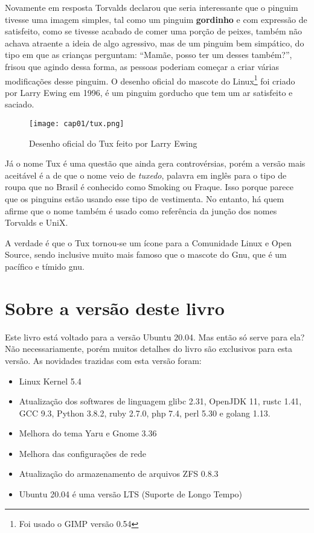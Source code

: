 Novamente em resposta Torvalds declarou que seria interessante que o pinguim tivesse uma imagem simples, tal como um pinguim \textbf{gordinho} e com expressão de satisfeito, como se tivesse acabado de comer uma porção de peixes, também não achava atraente a ideia de algo agressivo, mas de um pinguim bem simpático, do tipo em que as crianças perguntam: ``Mamãe, posso ter um desses também?'', frisou que agindo dessa forma, as pessoas poderiam começar a criar várias modificações desse pinguim. O desenho oficial do mascote do Linux\footnote{Foi usado o GIMP versão 0.54} foi criado por Larry Ewing em 1996, é um pinguim gorducho que tem um ar satisfeito e saciado.

\begin{figure}[H]
\centering\texttt{[image: cap01/tux.png]}
\caption{Desenho oficial do Tux feito por Larry Ewing}
\end{figure}

Já o nome Tux é uma questão que ainda gera controvérsias, porém a versão mais aceitável é a de que o nome veio de \textit{tuxedo}, palavra em inglês para o tipo de roupa que no Brasil é conhecido como Smoking ou Fraque. Isso porque parece que os pinguins estão usando esse tipo de vestimenta. No entanto, há quem afirme que o nome também é usado como referência da junção dos nomes Torvalds e UniX.

A verdade é que o Tux tornou-se um ícone para a Comunidade Linux e Open Source, sendo inclusive muito mais famoso que o mascote do Gnu, que é um pacífico e tímido gnu.

\section{Sobre a versão deste livro}
Este livro está voltado para a versão Ubuntu 20.04. Mas então só serve para ela? Não necessariamente, porém muitos detalhes do livro são exclusivos para esta versão. As novidades trazidas com esta versão foram: \vspace{-1em}
\begin{itemize}[noitemsep]
 \item Linux Kernel 5.4
 \item Atualização dos softwares de linguagem glibc 2.31, OpenJDK 11, rustc 1.41, GCC 9.3, Python 3.8.2, ruby 2.7.0, php 7.4, perl 5.30 e golang 1.13.
 \item Melhora do tema Yaru e Gnome 3.36
 \item Melhora das configurações de rede
 \item Atualização do armazenamento de arquivos ZFS 0.8.3
 \item Ubuntu 20.04 é uma versão LTS (Suporte de Longo Tempo)
\end{itemize}

